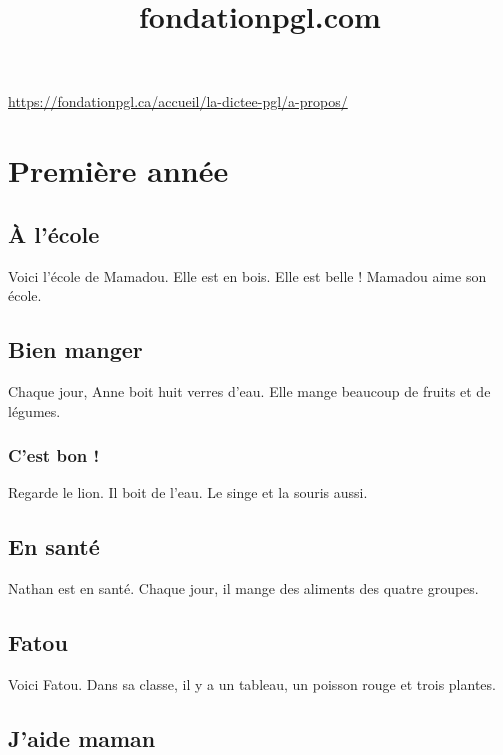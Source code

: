 \documentclass[11pt, french]{article}
\title{fondationpgl.com}
\begin{document}
\maketitle

\url{https://fondationpgl.ca/accueil/la-dictee-pgl/a-propos/}

\tableofcontents

\vfill



\section{Première année}

\subsection{À l'école}

Voici l'école de Mamadou. Elle est en bois. Elle est belle ! Mamadou aime son école.

\subsection{Bien manger}

Chaque jour, Anne boit huit verres d'eau. Elle mange beaucoup de fruits et de légumes.

\subsubsection{C'est bon !}

Regarde le lion. Il boit de l'eau. Le singe et la souris aussi.

\subsection{En santé}

Nathan est en santé. Chaque jour, il mange des aliments des quatre groupes.

\subsection{Fatou}

Voici Fatou. Dans sa classe, il y a un tableau, un poisson rouge et trois plantes.

\subsection{J'aide maman}
\end{document}
